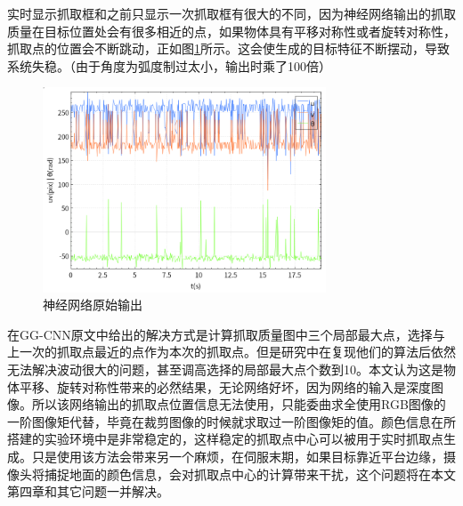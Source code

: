 \documentclass[fontset=fandol,type=bachelor,campus=harbin,bsmainpagenumberline=true]{hithesisbook}
\begin{document}
实时显示抓取框和之前只显示一次抓取框有很大的不同，因为神经网络输出的抓取质量在目标位置处会有很多相近的点，如果物体具有平移对称性或者旋转对称性，抓取点的位置会不断跳动，正如图\ref{神经网络原始输出}所示。这会使生成的目标特征不断摆动，导致系统失稳。（由于角度为弧度制过太小，输出时乘了100倍）
\begin{figure}[h]
\centering
\includegraphics[width = 0.75\textwidth]{chapter3/神经网络原始输出}
\caption{神经网络原始输出}
\label{神经网络原始输出}
\end{figure}


在GG-CNN原文中给出的解决方式是计算抓取质量图中三个局部最大点，选择与上一次的抓取点最近的点作为本次的抓取点。但是研究中在复现他们的算法后依然无法解决波动很大的问题，甚至调高选择的局部最大点个数到10。本文认为这是物体平移、旋转对称性带来的必然结果，无论网络好坏，因为网络的输入是深度图像。所以该网络输出的抓取点位置信息无法使用，只能委曲求全使用RGB图像的一阶图像矩代替，毕竟在裁剪图像的时候就求取过一阶图像矩的值。颜色信息在所搭建的实验环境中是非常稳定的，这样稳定的抓取点中心可以被用于实时抓取点生成。只是使用该方法会带来另一个麻烦，在伺服末期，如果目标靠近平台边缘，摄像头将捕捉地面的颜色信息，会对抓取点中心的计算带来干扰，这个问题将在本文第四章和其它问题一并解决。
\end{document}
